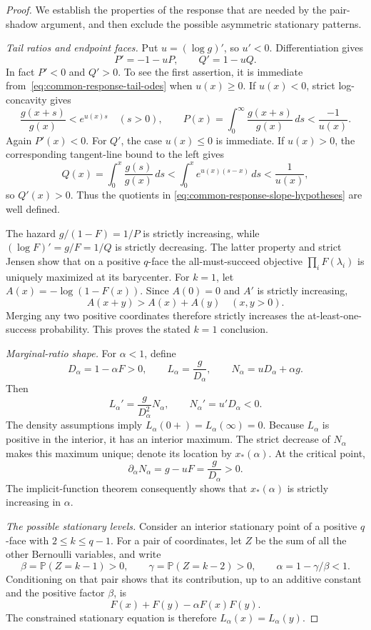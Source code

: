 \documentclass[11pt]{article}
\theoremstyle{definition}
\theoremstyle{remark}
\newcommand{\Pbb}{\mathbb P}
\newcommand{\1}{\mathbf 1}
\begin{document}
\begin{proof}
We establish the properties of the response that are needed by the
pair-shadow argument, and then exclude the possible asymmetric
stationary patterns.

\medskip\noindent\emph{Tail ratios and endpoint faces.}
Put \(u=(\log g)'\), so \(u'<0\).  Differentiation gives
\begin{equation}\label{eq:common-response-tail-odes}
  P'=-1-uP,\qquad Q'=1-uQ.
\end{equation}
In fact \(P'<0\) and \(Q'>0\).  To see the first assertion, it is
immediate from~\eqref{eq:common-response-tail-odes} when \(u(x)\ge0\).
If \(u(x)<0\), strict log-concavity gives
\[
  \frac{g(x+s)}{g(x)}<e^{u(x)s}\quad(s>0),
  \qquad
  P(x)=\int_0^\infty\frac{g(x+s)}{g(x)}\,ds<\frac{-1}{u(x)}.
\]
Again \(P'(x)<0\).  For \(Q'\), the case \(u(x)\le0\) is
immediate.  If \(u(x)>0\), the corresponding tangent-line bound
to the left gives
\[
  Q(x)=\int_0^x\frac{g(s)}{g(x)}\,ds
       <\int_0^x e^{u(x)(s-x)}\,ds<\frac1{u(x)},
\]
so \(Q'(x)>0\).  Thus the quotients in
\eqref{eq:common-response-slope-hypotheses} are well defined.

The hazard \(g/(1-F)=1/P\) is strictly increasing, while
\((\log F)'=g/F=1/Q\) is strictly decreasing.  The latter property
and strict Jensen show that on a positive \(q\)-face the
all-must-succeed objective \(\prod_iF(\lambda_i)\) is uniquely
maximized at its barycenter.  For \(k=1\), let
\(A(x)=-\log(1-F(x))\).  Since \(A(0)=0\) and \(A'\) is strictly
increasing,
\[
  A(x+y)>A(x)+A(y)\quad(x,y>0).
\]
Merging any two positive coordinates therefore strictly increases
the at-least-one-success probability.  This proves the stated
\(k=1\) conclusion.

\medskip\noindent\emph{Marginal-ratio shape.}
For \(\alpha<1\), define
\[
  D_\alpha=1-\alpha F>0,
  \qquad L_\alpha=\frac g{D_\alpha},
  \qquad N_\alpha=uD_\alpha+\alpha g.
\]
Then
\[
  L_\alpha'=\frac g{D_\alpha^2}N_\alpha,
  \qquad N_\alpha'=u'D_\alpha<0.
\]
The density assumptions imply
\(L_\alpha(0+)=L_\alpha(\infty)=0\).  Because \(L_\alpha\) is
positive in the interior, it has an interior maximum.  The strict
decrease of \(N_\alpha\) makes this maximum unique; denote its
location by \(x_*(\alpha)\).  At the critical point,
\[
  \partial_\alpha N_\alpha=g-uF=\frac g{D_\alpha}>0.
\]
The implicit-function theorem consequently shows that
\(x_*(\alpha)\) is strictly increasing in \(\alpha\).

\medskip\noindent\emph{The possible stationary levels.}
Consider an interior stationary point of a positive \(q\)-face with
\(2\le k\le q-1\).  For a pair of coordinates, let \(Z\) be the
sum of all the other Bernoulli variables, and write
\[
  \beta=\Pbb(Z=k-1)>0,\qquad
  \gamma=\Pbb(Z=k-2)>0,\qquad
  \alpha=1-\gamma/\beta<1.
\]
Conditioning on that pair shows that its contribution, up to an
additive constant and the positive factor \(\beta\), is
\[
  F(x)+F(y)-\alpha F(x)F(y).
\]
The constrained stationary equation is therefore
\(L_\alpha(x)=L_\alpha(y)\).


\end{proof}
\end{document}
